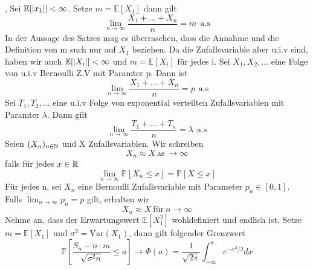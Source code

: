 \sep
\Theo[6.1] \newline
Sei \( \mathbb{E}[\left\lvert x_1 \right\rvert] < \infty \). Setze \(m = \mathbb{E}[X_1]\) dann gilt \[ \lim_{n \rightarrow \infty} \frac{X_1 + \dots + X_n}{n} = m \ \ \text{a.s}\]
\Bem[6.2] \newline
In der Aussage des Satzes mag es überraschen, dass die Annahme und die Definition von m such nur auf \(X_1\) beziehen. Da die Zufallsvariable aber u.i.v sind, haben wir auch \( \mathbb{E}[\left\lvert X_i \right\rvert] < \infty \) und \(m = \mathbb{E}[X_i]\) für jedes i.
\Bsp[6.2A] \newline
Sei \(X_1, X_2, \dots \) eine Folge von u.i.v Bernoulli Z.V mit Paramter p. Dann ist \[ \lim_{n \rightarrow  \infty } \frac{X_1 + \dots + X_n }{n} = p \ \ \text{a.s}\]
\Bsp[6.2B] \newline
Sei \(T_1, T_2, \dots \) eine u.i.v Folge von exponential verteilten Zufallsvariablen mit Paramter \( \lambda \). Dann gilt \[ \lim_{n \rightarrow \infty} \frac{T_1 + \dots + T_n }{n} = \lambda \ \ \text{a.s}\]
\Def[6.3] \newline
Seien \( (X_n)_{n \in \mathbb{N} }\) und X Zufallsvariablen. Wir schreiben \[X_n \approx X \ \text{as} \ \rightarrow \infty \]
falls für jedes \( x \in \mathbb{R} \) \[\lim_{n \rightarrow \infty } \mathbb{P}[X_n \leq x ] = \mathbb{P}[X \leq x]\]
\Bsp[6.3A] \newline
Für jedes n, sei \(X_n \) eine Bernoulli Zufallsvariable mit Parameter \(p_n \in [0,1 ]\). Falls \( \lim_{n \rightarrow \infty } p_n = p \) gilt, erhalten wir \[X_n \approx X \ \text{für} \ n \rightarrow \infty\] 
\Theo[6.4 ZGWS] \newline
Nehme an, dass der Erwartungswert \(\mathbb{E}[X_1^2]\) wohldefiniert und endlich ist. Setze \(m = \mathbb{E}[X_1]\) und \( \sigma^2 = \text{Var}(X_1)\), dann gilt folgender Grenzwert \[ \mathbb{P}[\frac{S_n - n \cdot m }{\sqrt{\sigma^2n}} \leq a] \rightarrow \Phi(a) = \frac{1}{\sqrt{2 \pi}} \int_{-\infty}^{a} e^{-x^2/2}dx\]